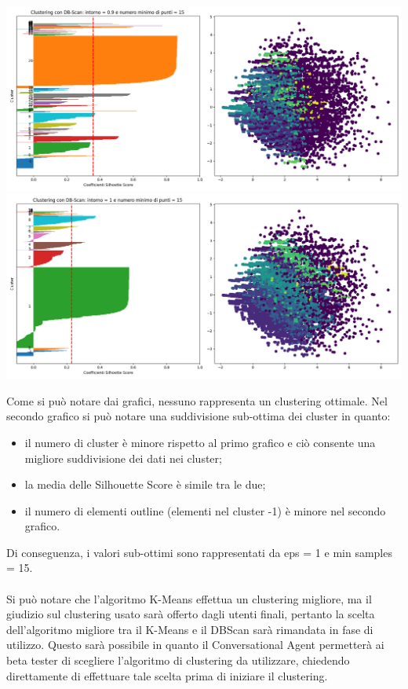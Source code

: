 \documentclass[a4paper, 10pt]{report}
\begin{document}
                \begin{center}
                    \includegraphics[width=14cm]{evaluation/DBScan_0.9-15.png}
                    \includegraphics[width=14cm]{evaluation/DBScan_1-15.png} \\
                \end{center}

                Come si può notare dai grafici, nessuno rappresenta un clustering ottimale.
                Nel secondo grafico si può notare una suddivisione sub-ottima dei cluster in quanto:
                \begin{itemize}
                    \item il numero di cluster è minore rispetto al primo grafico e ciò consente una migliore suddivisione dei dati nei cluster;
                    \item la media delle Silhouette Score è simile tra le due;
                    \item il numero di elementi outline (elementi nel cluster -1) è minore nel secondo grafico.
                \end{itemize}

                Di conseguenza, i valori sub-ottimi sono rappresentati da eps = 1 e min samples = 15.

                \paragraph{}
                Si può notare che l'algoritmo K-Means effettua un clustering migliore, ma il giudizio sul clustering usato sarà offerto dagli
                utenti finali, pertanto la scelta dell'algoritmo migliore tra il K-Means e il DBScan sarà rimandata in fase di utilizzo.
                Questo sarà possibile in quanto il Conversational Agent permetterà ai beta tester di scegliere l'algoritmo di clustering
                da utilizzare, chiedendo direttamente di effettuare tale scelta prima di iniziare il clustering.
\end{document}
